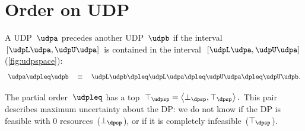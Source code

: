 \section{Order on UDP}
\begin{definition}
  A UDP~$\udpa$ precedes another UDP~$\udpb$ if the interval~$[\udpL\udpa,\udpU\udpa]$
  is contained in the interval~$[\udpL\udpa,\udpU\udpa]$ (\cref{fig:udpspace}):
  \[
    \udpa\udpleq\udpb\quad\equiv\quad\udpL\udpb\dpleq\udpL\udpa\dpleq\udpU\udpa\dpleq\udpU\udpb.
  \]
\end{definition}

The partial order~$\udpleq$ has a top~$\top_{\udpsp}=\left\langle \bot_{\dpsp},\top_{\dpsp}\right\rangle .$
This pair describes maximum uncertainty about the DP: we do not know
if the DP is feasible with 0 resources~($\bot_{\dpsp}$), or if it
is completely infeasible~($\top_{\dpsp}$).

